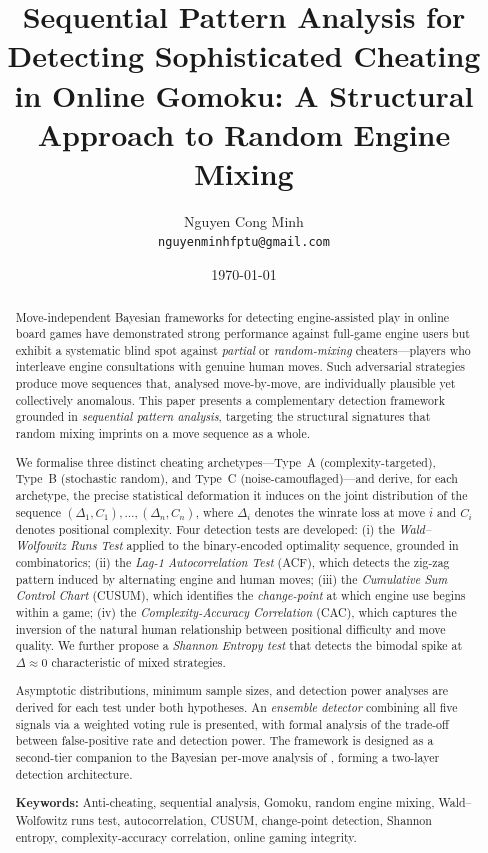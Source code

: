 \documentclass[11pt,a4paper]{article}
\title{
    Sequential Pattern Analysis for Detecting Sophisticated Cheating\\
    in Online Gomoku: A Structural Approach to Random Engine Mixing
}
\author{
    Nguyen Cong Minh \\
    \texttt{nguyenminhfptu@gmail.com}
}
\date{\today}
\begin{document}
\maketitle

\begin{abstract}
Move-independent Bayesian frameworks for detecting engine-assisted play in
online board games have demonstrated strong performance against full-game
engine users but exhibit a systematic blind spot against \emph{partial}
or \emph{random-mixing} cheaters---players who interleave engine consultations
with genuine human moves. Such adversarial strategies produce move sequences
that, analysed move-by-move, are individually plausible yet collectively
anomalous. This paper presents a complementary detection framework grounded
in \emph{sequential pattern analysis}, targeting the structural signatures
that random mixing imprints on a move sequence as a whole.

We formalise three distinct cheating archetypes---Type~A
(complexity-targeted), Type~B (stochastic random), and Type~C
(noise-camouflaged)---and derive, for each archetype, the precise
statistical deformation it induces on the joint distribution of the
sequence $(\Delta_1, C_1), \ldots, (\Delta_n, C_n)$, where $\Delta_i$
denotes the winrate loss at move $i$ and $C_i$ denotes positional complexity.
Four detection tests are developed:
(i) the \emph{Wald--Wolfowitz Runs Test} applied to the binary-encoded
optimality sequence, grounded in combinatorics;
(ii) the \emph{Lag-1 Autocorrelation Test} (ACF), which detects the
zig-zag pattern induced by alternating engine and human moves;
(iii) the \emph{Cumulative Sum Control Chart} (CUSUM), which identifies
the \emph{change-point} at which engine use begins within a game;
(iv) the \emph{Complexity-Accuracy Correlation} (CAC), which captures
the inversion of the natural human relationship between positional
difficulty and move quality.
We further propose a \emph{Shannon Entropy test} that detects
the bimodal spike at $\Delta \approx 0$ characteristic of mixed strategies.

Asymptotic distributions, minimum sample sizes, and detection power
analyses are derived for each test under both hypotheses. An
\emph{ensemble detector} combining all five signals via a weighted
voting rule is presented, with formal analysis of the trade-off between
false-positive rate and detection power. The framework is designed
as a second-tier companion to the Bayesian per-move analysis of
\citet{nguyen2025bayesian}, forming a two-layer detection architecture.

\medskip
\noindent
\textbf{Keywords:} Anti-cheating, sequential analysis, Gomoku, random engine
mixing, Wald--Wolfowitz runs test, autocorrelation, CUSUM, change-point
detection, Shannon entropy, complexity-accuracy correlation, online gaming
integrity.
\end{abstract}
\end{document}
